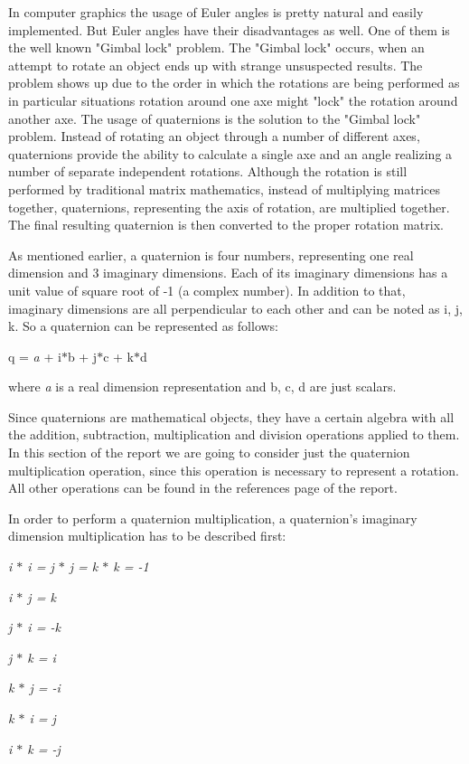 \documentclass[times, 10pt,twocolumn]{article}
\begin{document}
In computer graphics the usage of Euler angles is pretty natural and easily implemented. But Euler angles have their disadvantages as well. One of them is the well known "Gimbal lock" problem.  The "Gimbal lock" occurs, when an attempt to rotate an object ends up with strange unsuspected results. The problem shows up due to the order in which the rotations are being performed as in particular situations rotation around one axe might "lock" the rotation around another axe. The usage of quaternions is the solution to the "Gimbal lock" problem. Instead of rotating an object through a number of different axes, quaternions provide the ability to calculate a single axe and an angle realizing a number of separate independent rotations. Although the rotation is still performed by traditional matrix mathematics, instead of multiplying matrices together, quaternions, representing the axis of rotation, are multiplied together. The final resulting quaternion is then converted to the proper rotation matrix.

As mentioned earlier, a quaternion is four numbers, representing one real dimension and 3 imaginary dimensions. Each of its imaginary dimensions has a unit value of square root of -1 (a complex number). In addition to that, imaginary dimensions are all perpendicular to each other and can be noted as i, j, k. So a quaternion can be represented as follows:
\begin{center}
q = \emph{a} + i$\ast$b + j$\ast$c + k$\ast$d
\end{center}
where \emph{a} is a real dimension representation and b,  c,  d are just scalars.

Since quaternions are mathematical objects, they have a certain algebra with all the addition, subtraction,  multiplication and division operations applied to them. In this section of the report we are going to consider just the quaternion multiplication operation, since this operation is necessary to represent a rotation. All other operations can be found in the references page of the report.

In order to perform a quaternion multiplication, a quaternion's imaginary dimension multiplication has to be described first:

\begin{description}
    \setlength{\itemsep}{0pt}

    \item \emph{i $\ast$ i = j $\ast$ j = k $\ast$ k = -1}
    \item \emph{i $\ast$ j = k}
    \item \emph{j $\ast$ i = -k}
    \item \emph{j $\ast$ k = i}
    \item \emph{k $\ast$ j = -i}
    \item \emph{k $\ast$ i =  j}
    \item \emph{i $\ast$ k = -j}
\end{description}
\end{document}
